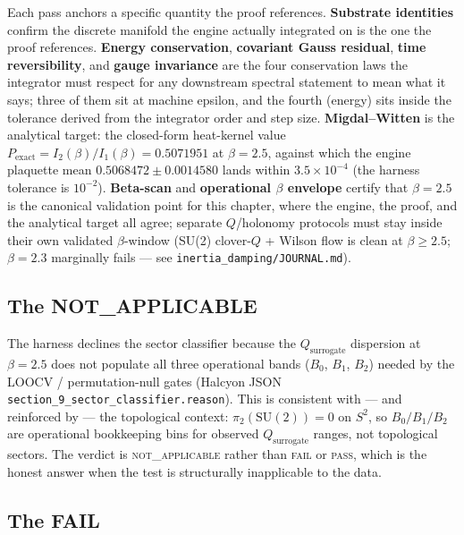 \documentclass[12pt,a4paper]{article}
\theoremstyle{plain}
\theoremstyle{definition}
\theoremstyle{remark}
\begin{document}
Each pass anchors a specific quantity the proof references. \textbf{Substrate identities} confirm the discrete manifold the engine actually integrated on is the one the proof references. \textbf{Energy conservation}, \textbf{covariant Gauss residual}, \textbf{time reversibility}, and \textbf{gauge invariance} are the four conservation laws the integrator must respect for any downstream spectral statement to mean what it says; three of them sit at machine epsilon, and the fourth (energy) sits inside the tolerance derived from the integrator order and step size. \textbf{Migdal--Witten} is the analytical target: the closed-form heat-kernel value $P_{\mathrm{exact}} = I_2(\beta)/I_1(\beta) = 0.5071951$ at $\beta = 2.5$, against which the engine plaquette mean $0.5068472 \pm 0.0014580$ lands within $3.5 \times 10^{-4}$ (the harness tolerance is $10^{-2}$). \textbf{Beta-scan} and \textbf{operational $\beta$ envelope} certify that $\beta = 2.5$ is the canonical validation point for this chapter, where the engine, the proof, and the analytical target all agree; separate $Q$/holonomy protocols must stay inside their own validated $\beta$-window (SU(2) clover-$Q$ + Wilson flow is clean at $\beta \geq 2.5$; $\beta = 2.3$ marginally fails --- see \texttt{inertia\_damping/JOURNAL.md}).

\subsection{The NOT\_APPLICABLE}
\label{subsec:na}

The harness declines the sector classifier because the $Q_{\mathrm{surrogate}}$ dispersion at $\beta = 2.5$ does not populate all three operational bands ($B_0$, $B_1$, $B_2$) needed by the LOOCV / permutation-null gates (Halcyon JSON \texttt{section\_9\_sector\_classifier.reason}). This is consistent with --- and reinforced by --- the topological context: $\pi_2(\mathrm{SU}(2)) = 0$ on $S^2$, so $B_0/B_1/B_2$ are operational bookkeeping bins for observed $Q_{\mathrm{surrogate}}$ ranges, not topological sectors. The verdict is \textsc{not\_applicable} rather than \textsc{fail} or \textsc{pass}, which is the honest answer when the test is structurally inapplicable to the data.

\subsection{The FAIL}
\end{document}
